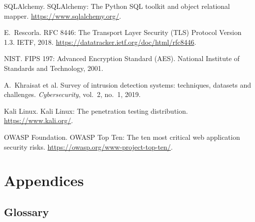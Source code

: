 \documentclass[12pt,a4paper]{report}
\begin{document}
\begin{enumerate}[label={[\arabic*]}, leftmargin=2.2em]
  \item SQLAlchemy. SQLAlchemy: The Python SQL toolkit and object relational mapper. \url{https://www.sqlalchemy.org/}.
  \item E.\ Rescorla. RFC 8446: The Transport Layer Security (TLS) Protocol Version 1.3. IETF, 2018. \url{https://datatracker.ietf.org/doc/html/rfc8446}.
  \item NIST. FIPS 197: Advanced Encryption Standard (AES). National Institute of Standards and Technology, 2001.
  \item A.\ Khraisat et al. Survey of intrusion detection systems: techniques, datasets and challenges. \textit{Cybersecurity}, vol.\ 2, no.\ 1, 2019.
  \item Kali Linux. Kali Linux: The penetration testing distribution. \url{https://www.kali.org/}.
  \item OWASP Foundation. OWASP Top Ten: The ten most critical web application security risks. \url{https://owasp.org/www-project-top-ten/}.
\end{enumerate}

\appendix
\chapter{Appendices}

\section{Glossary}
\end{document}
